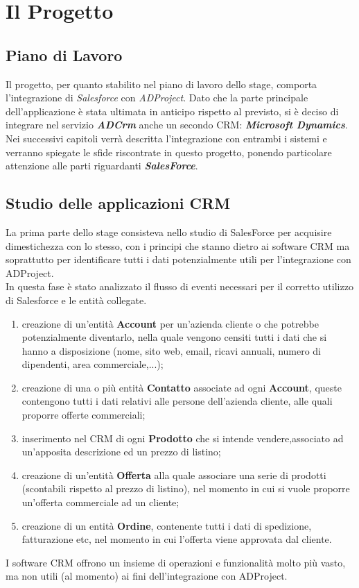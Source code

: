 \documentclass[12pt,a4paper,twoside,openany,english]{book}
\begin{document}
\chapter{Il Progetto}\label{introduzione}
	\section{Piano di Lavoro}
		Il progetto, per quanto stabilito nel piano di lavoro dello stage, comporta l'integrazione di \textit{Salesforce} con \textit{ADProject}. Dato che la parte principale dell'applicazione è stata ultimata in anticipo rispetto al previsto, si è deciso di integrare nel servizio \textit{\textbf{ADCrm}} anche un secondo \gls{CRM}: \textit{\textbf{Microsoft Dynamics}}.\\
		Nei successivi capitoli verrà descritta l'integrazione con entrambi i sistemi e verranno spiegate le sfide riscontrate in questo progetto, ponendo particolare attenzione alle parti riguardanti \textit{\textbf{SalesForce}}.
	\section{Studio delle applicazioni CRM}
		La prima parte dello stage consisteva nello studio di SalesForce per  acquisire dimestichezza con lo stesso, con i principi che stanno dietro ai software \gls{CRM} ma soprattutto per identificare tutti i dati potenzialmente utili per l'integrazione con ADProject.\\
		In questa fase è stato analizzato il flusso di eventi necessari per il corretto utilizzo di Salesforce e le entità collegate.		
		\begin{enumerate}
			\item creazione di un'entità \textbf{Account} per un'azienda cliente o che potrebbe potenzialmente diventarlo, nella quale vengono censiti tutti i dati che si hanno a disposizione (nome, sito web, email, ricavi annuali, numero di dipendenti, area commerciale,...);
			\item creazione di una o più entità \textbf{Contatto} associate ad ogni \textbf{Account}, queste contengono tutti i dati relativi alle persone dell'azienda cliente, alle quali proporre offerte commerciali;
			\item inserimento nel \gls{CRM} di ogni \textbf{Prodotto} che si intende vendere,associato ad un'apposita descrizione ed un prezzo di listino;
			\item creazione di un'entità \textbf{Offerta} alla quale associare una serie di prodotti (scontabili rispetto al prezzo di listino), nel momento in cui si vuole proporre un'offerta commerciale ad un cliente;
			\item creazione di un entità \textbf{Ordine}, contenente tutti i dati di spedizione, fatturazione etc, nel momento in cui l'offerta viene approvata dal cliente.
		\end{enumerate}
		I software \gls{CRM} offrono un insieme di operazioni e funzionalità molto più vasto, ma non utili (al momento) ai fini dell'integrazione con ADProject.\\
\end{document}
